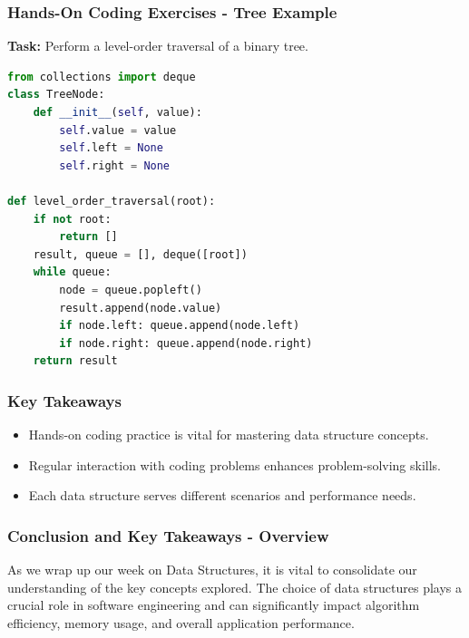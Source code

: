 \documentclass{beamer}
\begin{document}
\begin{frame}[fragile]
    \frametitle{Hands-On Coding Exercises - Tree Example}
    \textbf{Task:} Perform a level-order traversal of a binary tree.

    \begin{lstlisting}[language=Python]
from collections import deque
class TreeNode:
    def __init__(self, value):
        self.value = value
        self.left = None
        self.right = None

def level_order_traversal(root):
    if not root:
        return []
    result, queue = [], deque([root])
    while queue:
        node = queue.popleft()
        result.append(node.value)
        if node.left: queue.append(node.left)
        if node.right: queue.append(node.right)
    return result
    \end{lstlisting}
\end{frame}

\begin{frame}
    \frametitle{Key Takeaways}
    \begin{itemize}
        \item Hands-on coding practice is vital for mastering data structure concepts.
        \item Regular interaction with coding problems enhances problem-solving skills.
        \item Each data structure serves different scenarios and performance needs.
    \end{itemize}
\end{frame}

\begin{frame}[fragile]
    \frametitle{Conclusion and Key Takeaways - Overview}
    As we wrap up our week on Data Structures, it is vital to consolidate our understanding of the key concepts explored. The choice of data structures plays a crucial role in software engineering and can significantly impact algorithm efficiency, memory usage, and overall application performance.
\end{frame}
\end{document}
